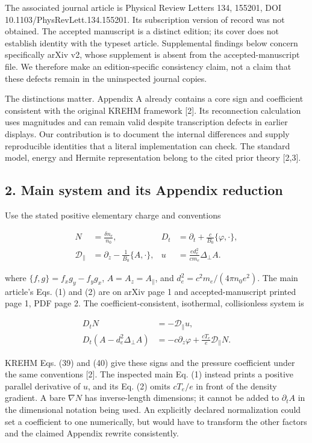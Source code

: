 The associated journal article is Physical Review Letters 134, 155201,
DOI 10.1103/PhysRevLett.134.155201. Its subscription version of record
was not obtained. The accepted manuscript is a distinct edition; its
cover does not establish identity with the typeset article. Supplemental
findings below concern specifically arXiv v2, whose supplement is absent
from the accepted-manuscript file. We therefore make an edition-specific
consistency claim, not a claim that these defects remain in the
uninspected journal copies.

The distinctions matter. Appendix A already contains a core sign and
coefficient consistent with the original KREHM framework {[}2{]}. Its
reconnection calculation uses magnitudes and can remain valid despite
transcription defects in earlier displays. Our contribution is to
document the internal differences and supply reproducible identities
that a literal implementation can check. The standard model, energy and
Hermite representation belong to the cited prior theory {[}2,3{]}.

\subsection{2. Main system and its Appendix
reduction}\label{main-system-and-its-appendix-reduction}

Use the stated positive elementary charge and conventions

\[
\begin{aligned}
N&=\frac{\delta n_e}{n_0},&
D_t&=\partial_t+\frac c{B_0}\{\varphi,\cdot\},\\
\mathcal D_\parallel&=\partial_z-\frac1{B_0}\{A,\cdot\},&
u&=\frac{ed_e^2}{cm_e}\Delta_\perp A.
\end{aligned}
\tag{1}
\]

where \(\{f,g\}=f_xg_y-f_yg_x\), \(A=A_z=A_\parallel\), and
\(d_e^2=c^2m_e/(4\pi n_0e^2)\). The main article's Eqs. (1) and (2) are
on arXiv page 1 and accepted-manuscript printed page 1, PDF page 2. The
coefficient-consistent, isothermal, collisionless system is

\[
\begin{aligned}
D_tN&=-\mathcal D_\parallel u,\\
D_t(A-d_e^2\Delta_\perp A)
&=-c\partial_z\varphi+\frac{cT_e}{e}\mathcal D_\parallel N.
\end{aligned}
\tag{2}
\]

KREHM Eqs. (39) and (40) give these signs and the pressure coefficient
under the same conventions {[}2{]}. The inspected main Eq. (1) instead
prints a positive parallel derivative of \(u\), and its Eq. (2) omits
\(cT_e/e\) in front of the density gradient. A bare \(\nabla N\) has
inverse-length dimensions; it cannot be added to \(\partial_tA\) in the
dimensional notation being used. An explicitly declared normalization
could set a coefficient to one numerically, but would have to transform
the other factors and the claimed Appendix rewrite consistently.

